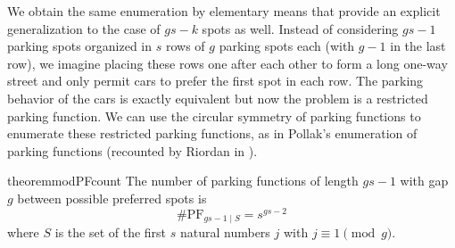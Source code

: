 \documentclass[12 pt]{amsart}
\theoremstyle{definition} %
\theoremstyle{remark} %
\begin{document}
We obtain the same enumeration by elementary means that provide an explicit generalization to the case of $gs - k$ spots as well. Instead of considering $gs - 1$ parking spots organized in $s$ rows of $g$ parking spots each (with $g - 1$ in the last row), we imagine placing these rows one after each other to form a long one-way street and only permit cars to prefer the first spot in each row. The parking behavior of the cars is exactly equivalent but now the problem is a restricted parking function. We can use the circular symmetry of parking functions to enumerate these restricted parking functions, as in Pollak's enumeration of parking functions (recounted by Riordan in \cite{riordan-1969}). 

\begin{restatable}{theorem}{modPFcount}
	\label{thm:modPFcount}
	The number of parking functions of length $gs - 1$ with gap $g$ between possible preferred spots is
	\[
		\# \mathrm{PF}_{gs - 1 \mid S} = s^{gs - 2}
	\]
	where $S$ is the set of the first $s$ natural numbers $j$ with $j \equiv 1 \pmod g$.
\end{restatable}
\end{document}
